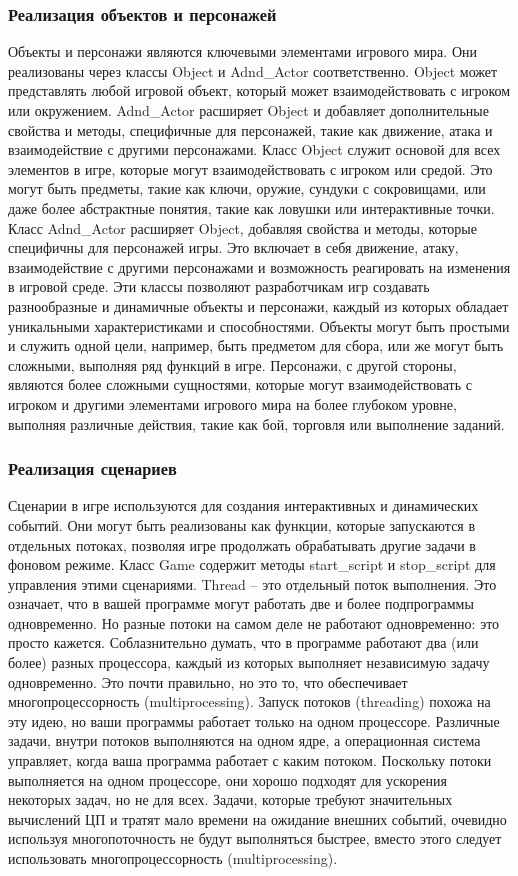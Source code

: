 \subsubsection{Реализация объектов и персонажей}
Объекты и персонажи являются ключевыми элементами игрового мира. Они реализованы через классы Object и Adnd\_Actor соответственно. Object может представлять любой игровой объект, который может взаимодействовать с игроком или окружением. Adnd\_Actor расширяет Object и добавляет дополнительные свойства и методы, специфичные для персонажей, такие как движение, атака и взаимодействие с другими персонажами.
Класс Object служит основой для всех элементов в игре, которые могут взаимодействовать с игроком или средой. Это могут быть предметы, такие как ключи, оружие, сундуки с сокровищами, или даже более абстрактные понятия, такие как ловушки или интерактивные точки.
Класс Adnd\_Actor расширяет Object, добавляя свойства и методы, которые специфичны для персонажей игры. Это включает в себя движение, атаку, взаимодействие с другими персонажами и возможность реагировать на изменения в игровой среде.
Эти классы позволяют разработчикам игр создавать разнообразные и динамичные объекты и персонажи, каждый из которых обладает уникальными характеристиками и способностями. Объекты могут быть простыми и служить одной цели, например, быть предметом для сбора, или же могут быть сложными, выполняя ряд функций в игре. Персонажи, с другой стороны, являются более сложными сущностями, которые могут взаимодействовать с игроком и другими элементами игрового мира на более глубоком уровне, выполняя различные действия, такие как бой, торговля или выполнение заданий.
\subsubsection{Реализация сценариев}
Сценарии в игре используются для создания интерактивных и динамических событий. Они могут быть реализованы как функции, которые запускаются в отдельных потоках, позволяя игре продолжать обрабатывать другие задачи в фоновом режиме. Класс Game содержит методы start\_script и stop\_script для управления этими сценариями. Thread – это отдельный поток выполнения. Это означает, что в вашей программе могут работать две и более подпрограммы одновременно. Но разные потоки на самом деле не работают одновременно: это просто кажется.
Соблазнительно думать, что в программе работают два (или более) разных процессора, каждый из которых выполняет независимую задачу одновременно. Это почти правильно, но это то, что обеспечивает многопроцессорность (multiprocessing).
Запуск потоков (threading) похожа на эту идею, но ваши программы работает только на одном процессоре. Различные задачи, внутри потоков выполняются на одном ядре, а операционная система управляет, когда ваша программа работает с каким потоком.
Поскольку потоки выполняется на одном процессоре, они хорошо подходят для ускорения некоторых задач, но не для всех. Задачи, которые требуют значительных вычислений ЦП и тратят мало времени на ожидание внешних событий, очевидно используя многопоточность не будут выполняться быстрее, вместо этого следует использовать многопроцессорность (multiprocessing).


